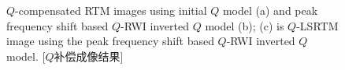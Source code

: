 \begin{figure}[!htbp]
    \centering
	{$Q$-compensated RTM images using initial
	$Q$ model (a) and peak frequency shift based $Q$-RWI inverted $Q$ model (b); (c) is 
	$Q$-LSRTM image using the peak frequency shift based $Q$-RWI inverted $Q$ model.}
    [$Q$补偿成像结果]
    \label{fig:rtm_fmodel}
\end{figure}

